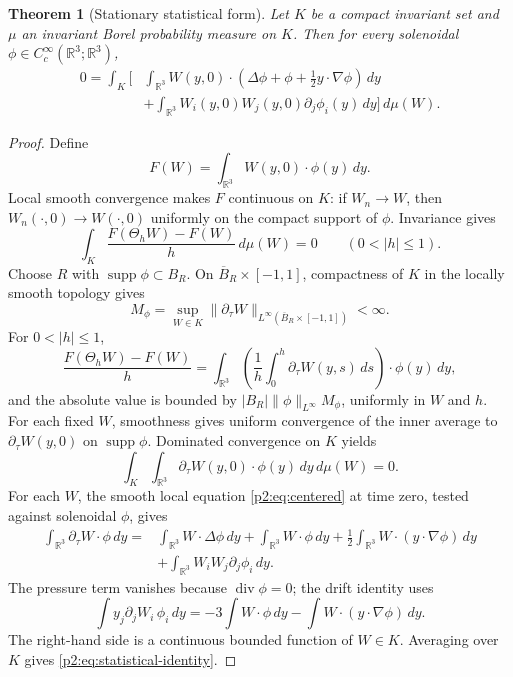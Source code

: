 \documentclass[11pt]{amsart}
\theoremstyle{plain}
\newtheorem{theorem}{Theorem}[section]
\theoremstyle{definition}
\theoremstyle{remark}
\numberwithin{equation}{section}
\newcommand{\R}{\mathbb R}
\newcommand{\supp}{\operatorname{supp}}
\newcommand{\divergence}{\operatorname{div}}
\begin{document}
\begin{theorem}[Stationary statistical form]\label{p2:thm:statistical-identity}
Let \(K\) be a compact invariant set and \(\mu\) an invariant Borel
probability measure on \(K\).  Then for every solenoidal
\(\phi\in C_c^\infty(\R^3;\R^3)\),
\begin{equation}\label{p2:eq:statistical-identity}
\begin{aligned}
0
=
\int_K
\bigg[
   &\int_{\R^3}
   W(y,0)\cdot
   \left(\Delta\phi+\phi+\frac12 y\cdot\nabla\phi\right)\,dy  \\
   &+
   \int_{\R^3}
   W_i(y,0)W_j(y,0)\partial_j\phi_i(y)\,dy
\bigg]\,d\mu(W).
\end{aligned}
\end{equation}
\end{theorem}

\begin{proof}
Define
\[
   F(W)=\int_{\R^3}W(y,0)\cdot\phi(y)\,dy .
\]
Local smooth convergence makes \(F\) continuous on \(K\): if \(W_n\to W\),
then \(W_n(\cdot,0)\to W(\cdot,0)\) uniformly on the compact support of
\(\phi\).  Invariance gives
\[
   \int_K\frac{F(\Theta_hW)-F(W)}{h}\,d\mu(W)=0
   \qquad (0<|h|\le1).
\]
Choose \(R\) with \(\supp\phi\subset B_R\).  On
\(\overline B_R\times[-1,1]\), compactness of \(K\) in the locally smooth
topology gives
\[
   M_\phi
   =
   \sup_{W\in K}
   \|\partial_\tau W\|_{L^\infty(\overline B_R\times[-1,1])}
   <\infty .
\]
For \(0<|h|\le1\),
\[
   \frac{F(\Theta_hW)-F(W)}{h}
   =
   \int_{\R^3}
   \left(\frac1h\int_0^h\partial_\tau W(y,s)\,ds\right)\cdot\phi(y)\,dy,
\]
and the absolute value is bounded by
\(|B_R|\|\phi\|_{L^\infty}M_\phi\), uniformly in \(W\) and \(h\).  For each
fixed \(W\), smoothness gives uniform convergence of the inner average to
\(\partial_\tau W(y,0)\) on \(\supp\phi\).  Dominated convergence on \(K\)
yields
\[
   \int_K\int_{\R^3}\partial_\tau W(y,0)\cdot\phi(y)\,dy\,d\mu(W)=0 .
\]
For each \(W\), the smooth local equation \eqref{p2:eq:centered} at time zero,
tested against solenoidal \(\phi\), gives
\[
\begin{aligned}
\int_{\R^3}\partial_\tau W\cdot\phi\,dy
=
&\int_{\R^3} W\cdot\Delta\phi\,dy
 +\int_{\R^3} W\cdot\phi\,dy
 +\frac12\int_{\R^3}W\cdot(y\cdot\nabla\phi)\,dy\\
&+\int_{\R^3}W_iW_j\partial_j\phi_i\,dy .
\end{aligned}
\]
The pressure term vanishes because \(\divergence\phi=0\); the drift identity
uses
\[
   \int y_j\partial_jW_i\,\phi_i\,dy
   =
   -3\int W\cdot\phi\,dy-\int W\cdot(y\cdot\nabla\phi)\,dy .
\]
The right-hand side is a continuous bounded function of \(W\in K\).  Averaging
over \(K\) gives \eqref{p2:eq:statistical-identity}.
\end{proof}
\end{document}
